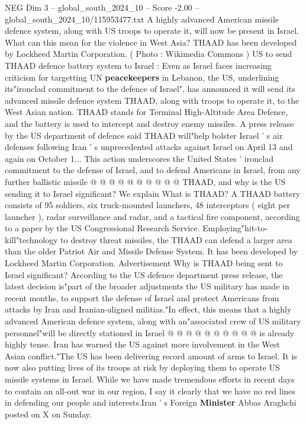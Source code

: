 \begin{textsample}{NEG Dim 3 – global\_south\_2024\_10 – Score -2.00 – global\_south\_2024\_10/115953477.txt}  \label{ex:f3_neg_094}
A highly advanced American missile defence system, along with US troops to operate it, will now be present in Israel.
What can this mean for the violence in West Asia?
THAAD has been developed by Lockheed Martin Corporation. ( Photo : Wikimedia Commons ) US to send THAAD defence battery system to Israel : Even as Israel faces increasing criticism for targetting UN \textbf{peacekeepers} in Lebanon, the US, underlining its"ironclad commitment to the defence of Israel", has announced it will send its advanced missile defence system THAAD, along with troops to operate it, to the West Asian nation.
THAAD stands for Terminal High-Altitude Area Defence, and the battery is used to intercept and destroy enemy missiles.
A press release by the US department of defence said THAAD will"help bolster Israel ' s air defenses following Iran ' s unprecedented attacks against Israel on April 13 and again on October 1...
This action underscores the United States ' ironclad commitment to the defense of Israel, and to defend Americans in Israel, from any further ballistic missile @ @ @ @ @ @ @ @ @ @ THAAD, and why is the US sending it to Israel significant?
We explain What is THAAD?
A THAAD battery consists of 95 soldiers, six truck-mounted launchers, 48 interceptors ( eight per launcher ), radar surveillance and radar, and a tactical fire component, according to a paper by the US Congressional Research Service.
Employing"hit-to-kill"technology to destroy threat missiles, the THAAD can defend a larger area than the older Patriot Air and Missile Defense System.
It has been developed by Lockheed Martin Corporation.
Advertisement Why is THAAD being sent to Israel significant?
According to the US defence department press release, the latest decision is"part of the broader adjustments the US military has made in recent months, to support the defense of Israel and protect Americans from attacks by Iran and Iranian-aligned militias."In effect, this means that a highly advanced American defence system, along with an"associated crew of US military personnel"will be directly stationed in Israel @ @ @ @ @ @ @ @ @ @ is already highly tense.
Iran has warned the US against more involvement in the West Asian conflict."The US has been delivering record amount of arms to Israel.
It is now also putting lives of its troops at risk by deploying them to operate US missile systems in Israel.
While we have made tremendous efforts in recent days to contain an all-out war in our region, I say it clearly that we have no red lines in defending our people and interests.Iran ' s Foreign \textbf{Minister} Abbas Araghchi posted on X on Sunday.

\end{textsample}
